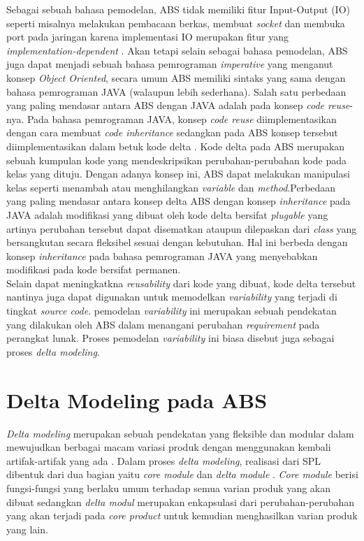 Sebagai sebuah bahasa pemodelan, ABS tidak memiliki fitur Input-Output (IO) seperti misalnya melakukan pembacaan berkas, membuat \textit{socket} dan membuka port pada jaringan karena implementasi IO merupakan fitur yang \textit{implementation-dependent} \citep{hahnle2013abstract}. Akan tetapi selain sebagai bahasa pemodelan, ABS juga dapat menjadi sebuah bahasa pemrograman \textit{imperative} yang menganut konsep \textit{Object Oriented}, secara umum ABS memiliki sintaks yang sama dengan bahasa pemrograman JAVA (walaupun lebih sederhana). Salah satu perbedaan yang paling mendasar antara ABS dengan JAVA adalah pada konsep \textit{code reuse}-nya. Pada bahasa pemrograman JAVA, konsep \textit{code reuse} diimplementasikan dengan cara membuat \textit{code inheritance} sedangkan pada ABS konsep tersebut diimplementasikan dalam betuk kode delta \citep{hahnle2013hats}. Kode delta pada ABS merupakan sebuah kumpulan kode yang mendeskripsikan perubahan-perubahan kode pada kelas yang dituju. Dengan adanya konsep ini, ABS dapat melakukan manipulasi kelas seperti menambah atau menghilangkan \textit{variable} dan \textit{method}.Perbedaan yang paling mendasar antara konsep delta ABS dengan konsep \textit{inheritance} pada JAVA adalah modifikasi yang dibuat oleh kode delta bersifat \textit{plugable} yang artinya perubahan tersebut dapat disematkan ataupun dilepaskan dari \textit{class} yang bersangkutan secara fleksibel sesuai dengan kebutuhan. Hal ini berbeda dengan konsep \textit{inheritance} pada bahasa pemrograman JAVA yang menyebabkan modifikasi pada kode bersifat permanen.\\

Selain dapat meningkatkna \textit{reusability} dari kode yang dibuat, kode delta tersebut nantinya juga dapat digunakan untuk memodelkan \textit{variability} yang terjadi di tingkat \textit{source code}. pemodelan \textit{variability} ini merupakan sebuah pendekatan yang dilakukan oleh ABS dalam menangani perubahan \textit{requirement} pada perangkat lunak. Proses pemodelan \textit{variability} ini biasa disebut juga sebagai proses \textit{delta modeling}. \\

\section{Delta Modeling pada ABS}

\textit{Delta modeling} merupakan sebuah pendekatan yang fleksible dan modular dalam mewujudkan berbagai macam variasi produk dengan menggunakan kembali artifak-artifak yang ada \citep{hahnle2013hats}. Dalam proses \textit{delta modeling}, realisasi dari SPL dibentuk dari dua bagian yaitu \textit{core module} dan \textit{delta module} \cite{haber2011delta}. \textit{Core module} berisi fungsi-fungsi yang berlaku umum terhadap semua varian produk yang akan dibuat sedangkan \textit{delta modul} merupakan enkapsulasi dari perubahan-perubahan yang akan terjadi pada \textit{core product} untuk kemudian menghasilkan varian produk yang lain.\\

